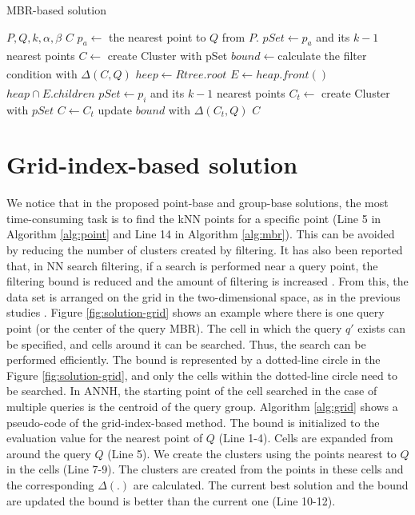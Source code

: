 \documentclass[a4paper,11pt]{report}
\theoremstyle{mytheoremstyle}
\begin{document}
\begin{algorithm}
\caption{MBR-based solution}         
\label{alg:mbr}
\begin{algorithmic}[1]                  
\renewcommand{\algorithmicrequire}{\textbf{Input:}}
\renewcommand{\algorithmicensure}{\textbf{Output:}}
\REQUIRE $P,Q,k,\alpha, \beta$
\ENSURE $C$
\STATE $p_a \xleftarrow[]{}$ the nearest point to $Q$ from $P$.
\STATE $pSet \xleftarrow{} p_a$ and its $k-1$ nearest points
\STATE $C \xleftarrow[]{}$ create Cluster with pSet
\STATE $bound \xleftarrow[]{} $calculate the filter condition with $\Delta(C,Q)$
\STATE $heep \xleftarrow[]{} Rtree.root$
\STATE $E \xleftarrow[]{}heap.front()$
\STATE $heap \cap E.children$
\ENDIF
{}
\STATE $pSet \xleftarrow{} p_i$ and its $k-1$ nearest points
\STATE $C_t \xleftarrow{}$ create Cluster with $pSet$
\STATE $C \xleftarrow{} C_t$
\STATE update $bound$ with $\Delta(C_t,Q)$
\ENDIF
\ENDIF
\ENDFOR
\ENDIF
\ENDIF
\ENDWHILE
\RETURN $C$
\end{algorithmic}
\end{algorithm}

\section{Grid-index-based solution}

We notice that in the proposed point-base and group-base solutions, the most time-consuming task is to find the kNN points for a specific point (Line 5 in Algorithm \ref{alg:point} and Line 14 in Algorithm \ref{alg:mbr}). This can be avoided by reducing the number of clusters created by filtering. It has also been reported that, in NN search filtering, if a search is performed near a query point, the filtering bound is reduced and the amount of filtering is increased \cite{BNNH}. From this, the data set is arranged on the grid in the two-dimensional space, as in the previous studies \cite{BNNH,weber1998quantitative,mouratidis2006continuous,yu2005monitoring,mouratidis2005conceptual,xiong2005sea}. Figure \ref{fig:solution-grid} shows an example where there is one query point (or the center of the query MBR). The cell in which the query $q'$ exists can be specified, and cells around it can be searched. Thus, the search can be performed efficiently. The bound is represented by a dotted-line circle in the Figure \ref{fig:solution-grid}, and only the cells within the dotted-line circle need to be searched. In ANNH, the starting point of the cell searched in the case of multiple queries is the centroid of the query group. Algorithm \ref{alg:grid} shows a pseudo-code of the grid-index-based method. The bound is initialized to the evaluation value for the nearest point of $Q$ (Line 1-4). Cells are expanded from around the query $Q$ (Line 5). We create the clusters using the points nearest to $Q$ in the cells (Line 7-9). The clusters are created from the points in these cells and the corresponding $\Delta(.)$ are calculated. The current best solution and the bound are updated the bound is better than the current one (Line 10-12). 
\end{document}
